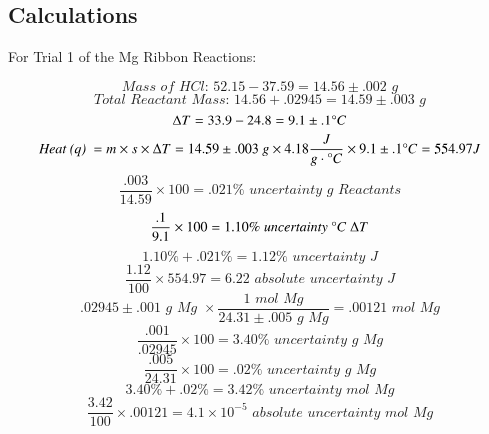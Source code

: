 \documentclass[12pt]{article}
\begin{document}
\subsection{Calculations}
For Trial 1 of the Mg Ribbon Reactions:

\begin{equation*}
\textit{Mass of HCl: } 52.15 - 37.59 = 14.56 \pm .002 \textit{ g}
\end{equation*}
\begin{equation*}
\textit{Total Reactant Mass: } 14.56 + .02945 = 14.59 \pm .003 \textit{ g}
\end{equation*}
\begin{equation*}
\Delta T = 33.9 - 24.8 = 9.1 \pm .1 \degree C
\end{equation*}
\begin{equation*}
\textit{Heat (q) } = m \times s \times \Delta T = 14.59 \pm .003 \textit{ g} \times 4.18 \frac{J}{g \cdot \degree C} \times 9.1 \pm .1 \degree C = 554.97 J
\end{equation*}
\begin{equation*}
\frac{.003}{14.59} \times 100 = .021\% \textit{ uncertainty g Reactants}
\end{equation*}
\begin{equation*}
\frac{.1}{9.1} \times 100 = 1.10\% \textit{ uncertainty } \degree C \textit{ } \Delta T
\end{equation*}
\begin{equation*}
1.10\% + .021\% = 1.12\% \textit{ uncertainty J}
\end{equation*}
\begin{equation*}
\frac{1.12}{100} \times 554.97 = 6.22 \textit{ absolute uncertainty J}
\end{equation*}
\begin{equation*}
.02945 \pm .001 \textit{ g Mg } \times \frac{1 \textit{ mol Mg}}{24.31 \pm .005 \textit{ g Mg}} = .00121 \textit{ mol Mg}
\end{equation*}
\begin{equation*}
\frac{.001}{.02945} \times 100 = 3.40\% \textit{ uncertainty g Mg}
\end{equation*}
\begin{equation*}
\frac{.005}{24.31} \times 100 = .02\% \textit{ uncertainty g Mg}
\end{equation*}
\begin{equation*}
3.40\% + .02\% = 3.42\% \textit{ uncertainty mol Mg}
\end{equation*}
\begin{equation*}
\frac{3.42}{100} \times .00121 = 4.1 \times 10^{-5} \textit{ absolute uncertainty mol Mg}
\end{equation*}
\end{document}
